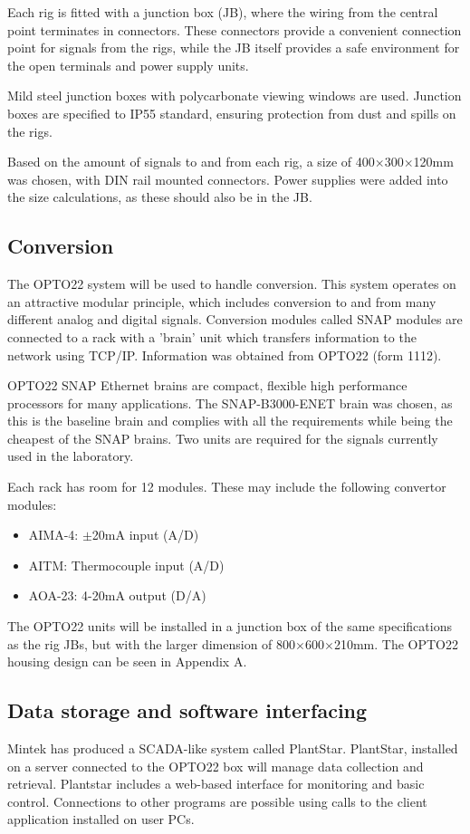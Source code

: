 Each rig is fitted with a junction box (JB), where the wiring from the central point terminates in connectors.  These connectors provide a convenient connection point for signals from the rigs, while the JB itself provides a safe environment for the open terminals and power supply units.  

Mild steel junction boxes with polycarbonate viewing windows are used.  Junction boxes are specified to IP55 standard, ensuring protection from dust and spills on the rigs.

Based on the amount of signals to and from each rig, a size of 400$\times$300$\times$120mm was chosen, with DIN rail mounted connectors.  Power supplies were added into the size calculations, as these should also be in the JB.

\subsection{Conversion}
The OPTO22 system will be used to handle conversion.  This system operates on an attractive modular principle, which includes conversion to and from many different analog and digital signals.  Conversion modules called SNAP modules are connected to a rack with a 'brain' unit which transfers information to the network using TCP/IP.  Information was obtained from OPTO22 (form 1112).

OPTO22 SNAP Ethernet brains are compact, flexible high performance processors for many applications.  The SNAP-B3000-ENET brain was chosen, as this is the baseline brain and complies with all the requirements while being the cheapest of the SNAP brains.  Two units are required for the signals currently used in the laboratory.

Each rack has room for 12 modules.  These may include the following convertor modules:
\begin{itemize}
	\item	AIMA-4: $\pm$20mA input (A/D)
	\item	AITM:  Thermocouple input (A/D)
	\item	AOA-23: 4-20mA output (D/A)
\end{itemize}

The OPTO22 units will be installed in a junction box of the same specifications as the rig JBs, but with the larger dimension of 800$\times$600$\times$210mm.  The OPTO22 housing design can be seen in Appendix A.

\subsection{Data storage and software interfacing}
Mintek has produced a SCADA-like system called PlantStar.  PlantStar, installed on a server connected to the OPTO22 box will manage data collection and retrieval.  Plantstar includes a web-based interface for monitoring and basic control.  Connections to other programs are possible using calls to the client application installed on user PCs.

